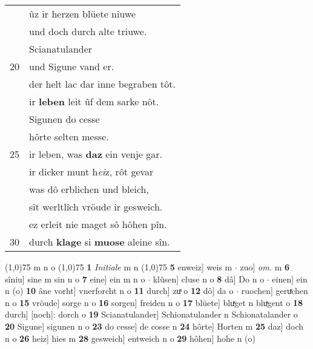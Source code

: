\documentclass[8pt,a4paper,notitlepage]{article}
\begin{document}
\begin{table}[ht]
\begin{minipage}[t]{0.5\linewidth}
\begin{tabular}{rl}
 & ûz ir herzen blüete niuwe\\ 
 & und doch durch alte triuwe.\\ 
 & Scianatulander\\ 
20 & und Sigune vand er.\\ 
 & der helt lac dar inne begraben tôt.\\ 
 & ir \textbf{leben} leit ûf dem sarke nôt.\\ 
 & Sigunen do cesse\\ 
 & hôrte selten messe.\\ 
25 & ir leben, was \textbf{daz} ein venje gar.\\ 
 & ir dicker munt h\textit{ei}z, rôt gevar\\ 
 & was dô erblichen und bleich,\\ 
 & sît werltlîch vröude ir gesweich.\\ 
 & ez erleit nie maget sô hôhen pîn.\\ 
30 & durch \textbf{klage} si \textbf{muose} aleine sîn.\\ 
\end{tabular}
\scriptsize
\line(1,0){75} \newline
m n o \newline
\line(1,0){75} \newline
\textbf{1} \textit{Initiale} m n  \newline
\line(1,0){75} \newline
\textbf{5} enweiz] weis m  $\cdot$ zuo] \textit{om.} m \textbf{6} sîniu] sine m sin n o \textbf{7} eine] ein m n o  $\cdot$ klûsen] cluse n o \textbf{8} dâ] Do n o  $\cdot$ einen] ein n (o) \textbf{10} âne vorht] vnerforcht n o \textbf{11} durch] zuͯ o \textbf{12} dô] da o  $\cdot$ ruochen] geruͯchen n o \textbf{15} vröude] sorge n o \textbf{16} sorgen] freiden n o \textbf{17} blüete] bluͯget n bluͯgent o \textbf{18} durch] [noch]: dorch o \textbf{19} Scianatulander] Schionatulander n Schionatalander o \textbf{20} Sigune] sigunen n o \textbf{23} do cesse] de cosse n \textbf{24} hôrte] Horten m \textbf{25} daz] doch n o \textbf{26} heiz] hies m \textbf{28} gesweich] entweich n o \textbf{29} hôhen] hohe n (o) \newline
\end{minipage}
\end{table}
\newpage
\end{document}
